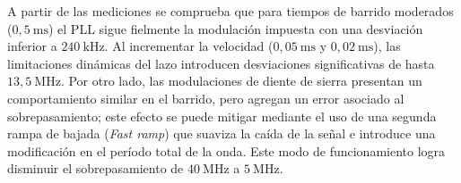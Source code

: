 \begin{table}[H]
\centering
{}
\caption{Resumen de resultados experimentales para diferentes perfiles y tiempos de barrido FMCW.}
\label{tab:resultados_fmcw}
\end{table}

A partir de las mediciones se comprueba que para tiempos de barrido moderados ($0{,}5~\mathrm{ms}$) el PLL sigue fielmente la modulación impuesta con una desviación inferior a $240~\mathrm{kHz}$. Al incrementar la velocidad ($0{,}05~\mathrm{ms}$ y $0{,}02~\mathrm{ms}$), las limitaciones dinámicas del lazo introducen desviaciones significativas de hasta $13{,}5~\mathrm{MHz}$. Por otro lado, las modulaciones de diente de sierra presentan un comportamiento similar en el barrido, pero agregan un error asociado al sobrepasamiento; este efecto se puede mitigar mediante el uso de una segunda rampa de bajada (\textit{Fast ramp}) que suaviza la caída de la señal e introduce una modificación en el período total de la onda. Este modo de funcionamiento logra disminuir el sobrepasamiento de $40~\mathrm{MHz}$ a $5~\mathrm{MHz}$.